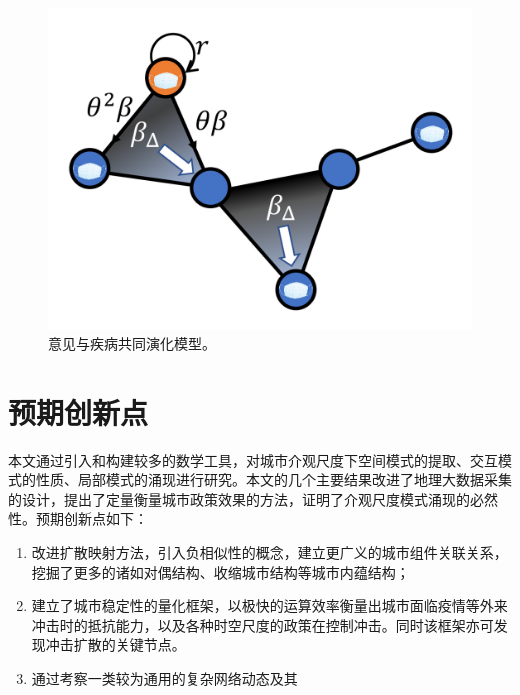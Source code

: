 \begin{figure}
    \centering
    \includegraphics[width = 0.7\linewidth]{Figs/masksketch.png}
    \caption{意见与疾病共同演化模型。}
    \label{fig:masksketch}
\end{figure}



\section{预期创新点}

本文通过引入和构建较多的数学工具，对城市介观尺度下空间模式的提取、交互模式的性质、局部模式的涌现进行研究。本文的几个主要结果改进了地理大数据采集的设计，提出了定量衡量城市政策效果的方法，证明了介观尺度模式涌现的必然性。预期创新点如下：\begin{enumerate}
    \item 改进扩散映射方法，引入负相似性的概念，建立更广义的城市组件关联关系，挖掘了更多的诸如对偶结构、收缩城市结构等城市内蕴结构；
    \item 建立了城市稳定性的量化框架，以极快的运算效率衡量出城市面临疫情等外来冲击时的抵抗能力，以及各种时空尺度的政策在控制冲击。同时该框架亦可发现冲击扩散的关键节点。
    \item 通过考察一类较为通用的复杂网络动态及其
\end{enumerate}